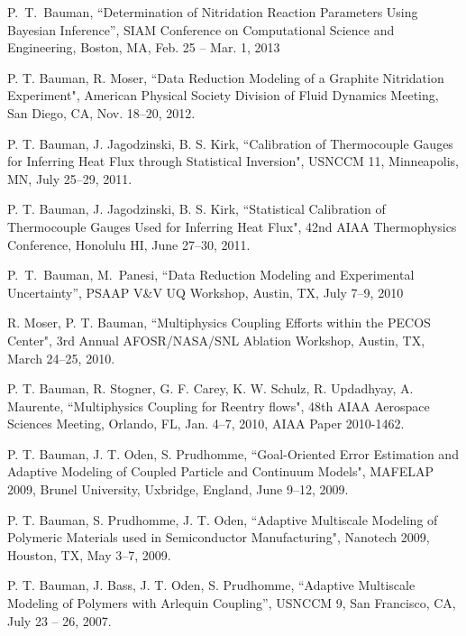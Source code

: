 P.~T.~Bauman,
``Determination of Nitridation Reaction Parameters Using Bayesian Inference'',
SIAM Conference on Computational Science and Engineering, Boston, MA, Feb. 25 -- Mar. 1, 2013

\blankline

P. T. Bauman, R. Moser,
``Data Reduction Modeling of a Graphite Nitridation Experiment", 
American Physical Society Division of Fluid Dynamics Meeting, San Diego, CA, Nov. 18--20, 2012.

\blankline

P. T. Bauman,  J. Jagodzinski, B. S. Kirk,
``Calibration of Thermocouple Gauges for Inferring Heat Flux through Statistical Inversion", USNCCM 11,
Minneapolis, MN, July 25--29, 2011.

\blankline

P. T. Bauman, J. Jagodzinski, B. S. Kirk,
``Statistical Calibration of Thermocouple Gauges Used for Inferring Heat Flux", 42nd AIAA Thermophysics
Conference, Honolulu HI, June 27--30, 2011.

\blankline

P.~T.~Bauman, M.~Panesi,
``Data Reduction Modeling and Experimental Uncertainty'',
PSAAP V\&V UQ Workshop, Austin, TX, July 7--9, 2010

\blankline


R. Moser, P. T. Bauman,
``Multiphysics Coupling Efforts within the PECOS Center", 
3rd Annual AFOSR/NASA/SNL Ablation Workshop, Austin, TX, March 24--25, 2010.

\blankline

P. T. Bauman, R. Stogner, G. F. Carey, K. W. Schulz, R. Updadhyay, A. Maurente,
``Multiphysics Coupling for Reentry flows",
48th AIAA Aerospace Sciences Meeting, Orlando, FL,  Jan. 4--7, 2010, AIAA Paper 2010-1462.

\blankline

P. T. Bauman, J. T. Oden, S. Prudhomme,
``Goal-Oriented Error Estimation and Adaptive Modeling of Coupled Particle and Continuum Models", 
MAFELAP 2009, Brunel University, Uxbridge, England, June 9--12, 2009.

\blankline

P. T. Bauman, S. Prudhomme, J. T. Oden,
``Adaptive Multiscale Modeling of Polymeric Materials used in Semiconductor Manufacturing", 
Nanotech 2009, Houston, TX, May 3--7, 2009.

\blankline

P. T. Bauman, J. Bass, J. T. Oden, S. Prudhomme,
``Adaptive Multiscale Modeling of Polymers with Arlequin Coupling'',
USNCCM 9, San Francisco, CA, July 23 -- 26, 2007.

